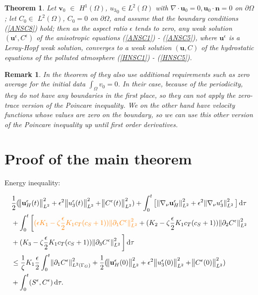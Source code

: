 \documentclass[11pt]{article}
\newtheorem{theorem}{Theorem}
\newtheorem{remark}{Remark}
\newcommand*\diff{\mathop{}\!\mathrm{d}}
\begin{document}
\begin{theorem} \label{maintheorem}
  Let $\mathbf{v}_0$ $\in$ $H^1 (\Omega)$, ${u_3}_0 \in L^2(\Omega)$ with $\nabla \cdot \mathbf{u}_0 = 0, \mathbf{u}_0 \cdot \mathbf{n} = 0$ on $\partial \Omega$; let $C_0 \in$ $L^2 (\Omega)$, $C_0 = 0$ on $ \partial \Omega$, and assume that the boundary conditions (\ref{ANSC8}) hold; then as the aspect ratio $\epsilon$ tends to zero, any  weak solution $(\mathbf{u}^\epsilon, C^\epsilon)$ of the anisotropic equations (\ref{ANSC1}) - (\ref{ANSC5}), where $\mathbf{u}^\epsilon$ is a Leray-Hopf weak solution, converges to a weak solution $(\mathbf{u}, C)$ of the hydrostatic equations of the polluted atmosphere (\ref{HNSC1}) - (\ref{HNSC5}).
\end{theorem}

\begin{remark}
In the theorem of \cite{li2019primitive} they also use additional requirements such as zero average for the initial data $\int_\Omega v_0 = 0$. In their case, because of the periodicity, they do not have any boundaries in the first place, so they can not apply the zero-trace version of the Poincare inequality. We on the other hand have velocity functions whose values are zero on the boundary, so we can use this other version of the Poincare inequality up until first order derivatives.
\end{remark}
  
\section{Proof of the main theorem} \label{proof}

Energy inequality:

  \begin{equation}\nonumber
    \begin{split}  
    & \frac{1}{2} (\norm{\mathbf{u}_H^\epsilon (t)}_{L^2}^2 + \epsilon ^ 2 \norm{u_3^\epsilon (t)}_{L^2}^2 + \norm{C^\epsilon (t)}_{L^2}^2) + \int_0 ^ t \big [\norm{\nabla_\nu \mathbf{u}_H^\epsilon}_{L^2}^2 + \epsilon ^ 2 \norm{\nabla_\nu u_3^\epsilon}_{L^2}^2 \big ] \diff \tau \\
    & + \int_0 ^ t \bigg[ \textcolor{orange}{ (\epsilon K_1 - \zeta \frac{\epsilon}{2} K_1 c_T (c_S + 1)) \norm{\partial_1 C^\epsilon}_{L^2}^2}  + (K_2 - \zeta \frac{\epsilon}{2} K_1 c_T (c_S + 1)) \norm{\partial_2 C^\epsilon}_{L^2}^2 \\
    & + (K_3 - \zeta \frac{\epsilon}{2} K_1 c_T (c_S + 1)) \norm{\partial_3 C^\epsilon}_{L^2}^2 \bigg] \diff \tau \\
    & \leq \frac{1}{\zeta} K_1 \frac{\epsilon}{2} \int_0 ^ t \norm{\partial_1 C^\epsilon}^2 _{L^2 (\Gamma_G)} + \frac{1}{2} (\norm{\mathbf{u}_H^\epsilon (0)}_{L^2}^2 + \epsilon ^ 2 \norm{u_3^\epsilon (0)}_{L^2}^2 + \norm{C^\epsilon (0)}_{L^2}^2) \\
    & + \int_0^t (S^\epsilon,C^\epsilon) \diff \tau.
    \end{split}
  \end{equation} 
\end{document}
